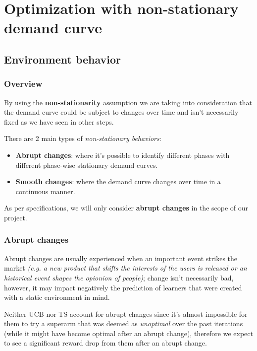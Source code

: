 \chapter{Optimization with non-stationary demand curve}
\label{chap:ns_demand}

\section{Environment behavior}
\label{sec:ns_demand_env}

\subsection{Overview}

By using the \textbf{non-stationarity} assumption we are taking into consideration that the demand curve could be subject to changes over time and isn't necessarily fixed as we have seen in other steps.

There are 2 main types of \textit{non-stationary behaviors}:
\begin{itemize}
    \item \textbf{Abrupt changes}: where it's possible to identify different phases with different phase-wise stationary demand curves.
    \item \textbf{Smooth changes}: where the demand curve changes over time in a continuous manner.
\end{itemize}

As per specifications, we will only consider \textbf{abrupt changes} in the scope of our project.

\subsection{Abrupt changes}

Abrupt changes are usually experienced when an important event strikes the market \textit{(e.g. a new product that shifts the interests of the users is released or an historical event shapes the opionion of people)}; change isn't necessarily bad, however, it may impact negatively the prediction of learners that were created with a static environment in mind.

Neither UCB nor TS account for abrupt changes since it's almost impossible for them to try a superarm that was deemed as \textit{unoptimal} over the past iterations (while it might have become optimal after an abrupt change), therefore we expect to see a significant reward drop from them after an abrupt change.

